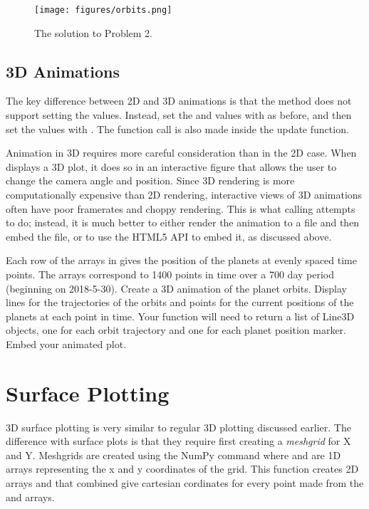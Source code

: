\begin{figure}[h]
\centering
\texttt{[image: figures/orbits.png]}
\caption{The solution to Problem 2.}
\label{lab0:3dplot}
\end{figure}

\subsection*{3D Animations}
The key difference between 2D and 3D animations is that the  method does not support setting the  values.
Instead, set the  and  values with  as before, and then set the  values with .
The  function call is also made inside the update function. 

Animation in 3D requires more careful consideration than in the 2D case.
When  displays a 3D plot, it does so in an interactive figure that allows the user to change the camera angle and position.
Since 3D rendering is more computationally expensive than 2D rendering, interactive views of 3D animations often have poor framerates and choppy rendering.
This is what calling  attempts to do; instead, it is much better to either render the animation to a file and then embed the file, or to use the HTML5 API to embed it, as discussed above.

\begin{problem}
Each row of the arrays in  gives the position of the planets at evenly spaced time points. The arrays correspond to 1400 points in time over a 700 day period (beginning on 2018-5-30).
Create a 3D animation of the planet orbits.
Display lines for the trajectories of the orbits and points for the current positions of the planets at each point in time.
Your  function will need to return a list of Line3D objects, one for each orbit trajectory and one for each planet position marker.
Embed your animated plot.
\end{problem}

\section*{Surface Plotting}
3D surface plotting is very similar to regular 3D plotting discussed earlier.
The difference with surface plots is that they require first creating a \textit{meshgrid} for X and Y. Meshgrids are created using the NumPy command  where  and  are 1D arrays representing the x and y coordinates of the grid.
This function creates 2D arrays  and  that combined give cartesian cordinates for every point made from the  and  arrays. 

